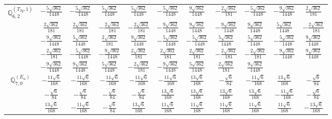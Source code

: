 \documentclass[fleqn,10pt,landscape]{article}
\begin{document}
\begin{itemize}
{\begin{center}
\begin{longtable}{ccccccccccc}
$\mathbb{Q}_{6,2}^{(T_{2g},1)}$ & $ - \frac{5 \sqrt{362}}{1448} $ & $ - \frac{5 \sqrt{362}}{1448} $ & $ \frac{5 \sqrt{362}}{1448} $ & $ \frac{5 \sqrt{362}}{1448} $ & $ - \frac{5 \sqrt{362}}{1448} $ & $ \frac{9 \sqrt{362}}{1448} $ & $ - \frac{2 \sqrt{362}}{181} $ & $ - \frac{5 \sqrt{362}}{1448} $ & $ - \frac{9 \sqrt{362}}{1448} $ & $ \frac{2 \sqrt{362}}{181} $ \\
& $ \frac{2 \sqrt{362}}{181} $ & $ \frac{2 \sqrt{362}}{181} $ & $ - \frac{2 \sqrt{362}}{181} $ & $ - \frac{2 \sqrt{362}}{181} $ & $ - \frac{9 \sqrt{362}}{1448} $ & $ \frac{9 \sqrt{362}}{1448} $ & $ - \frac{9 \sqrt{362}}{1448} $ & $ \frac{9 \sqrt{362}}{1448} $ & $ \frac{5 \sqrt{362}}{1448} $ & $ - \frac{2 \sqrt{362}}{181} $ \\
& $ - \frac{9 \sqrt{362}}{1448} $ & $ \frac{5 \sqrt{362}}{1448} $ & $ \frac{2 \sqrt{362}}{181} $ & $ \frac{9 \sqrt{362}}{1448} $ & $ - \frac{5 \sqrt{362}}{1448} $ & $ - \frac{5 \sqrt{362}}{1448} $ & $ \frac{5 \sqrt{362}}{1448} $ & $ \frac{5 \sqrt{362}}{1448} $ & $ - \frac{5 \sqrt{362}}{1448} $ & $ \frac{9 \sqrt{362}}{1448} $ \\
& $ - \frac{2 \sqrt{362}}{181} $ & $ - \frac{5 \sqrt{362}}{1448} $ & $ - \frac{9 \sqrt{362}}{1448} $ & $ \frac{2 \sqrt{362}}{181} $ & $ \frac{2 \sqrt{362}}{181} $ & $ \frac{2 \sqrt{362}}{181} $ & $ - \frac{2 \sqrt{362}}{181} $ & $ - \frac{2 \sqrt{362}}{181} $ & $ - \frac{9 \sqrt{362}}{1448} $ & $ \frac{9 \sqrt{362}}{1448} $ \\
& $ - \frac{9 \sqrt{362}}{1448} $ & $ \frac{9 \sqrt{362}}{1448} $ & $ \frac{5 \sqrt{362}}{1448} $ & $ - \frac{2 \sqrt{362}}{181} $ & $ - \frac{9 \sqrt{362}}{1448} $ & $ \frac{5 \sqrt{362}}{1448} $ & $ \frac{2 \sqrt{362}}{181} $ & $ \frac{9 \sqrt{362}}{1448} $ & $  $ & $  $ \\ \hline
$\mathbb{Q}_{7,0}^{(E_{u})}$ & $ - \frac{11 \sqrt{6}}{168} $ & $ - \frac{11 \sqrt{6}}{168} $ & $ - \frac{11 \sqrt{6}}{168} $ & $ - \frac{11 \sqrt{6}}{168} $ & $ - \frac{11 \sqrt{6}}{168} $ & $ \frac{13 \sqrt{6}}{168} $ & $ - \frac{\sqrt{6}}{84} $ & $ - \frac{11 \sqrt{6}}{168} $ & $ \frac{13 \sqrt{6}}{168} $ & $ - \frac{\sqrt{6}}{84} $ \\
& $ - \frac{\sqrt{6}}{84} $ & $ - \frac{\sqrt{6}}{84} $ & $ - \frac{\sqrt{6}}{84} $ & $ - \frac{\sqrt{6}}{84} $ & $ \frac{13 \sqrt{6}}{168} $ & $ \frac{13 \sqrt{6}}{168} $ & $ \frac{13 \sqrt{6}}{168} $ & $ \frac{13 \sqrt{6}}{168} $ & $ - \frac{11 \sqrt{6}}{168} $ & $ - \frac{\sqrt{6}}{84} $ \\
& $ \frac{13 \sqrt{6}}{168} $ & $ - \frac{11 \sqrt{6}}{168} $ & $ - \frac{\sqrt{6}}{84} $ & $ \frac{13 \sqrt{6}}{168} $ & $ \frac{11 \sqrt{6}}{168} $ & $ \frac{11 \sqrt{6}}{168} $ & $ \frac{11 \sqrt{6}}{168} $ & $ \frac{11 \sqrt{6}}{168} $ & $ \frac{11 \sqrt{6}}{168} $ & $ - \frac{13 \sqrt{6}}{168} $ \\

\end{longtable}
\end{center}}
\end{itemize}
\end{document}

